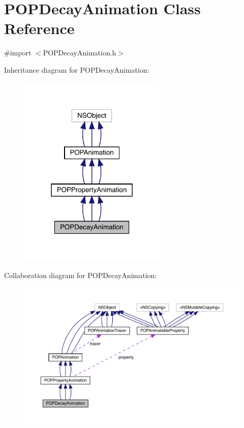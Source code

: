 \hypertarget{interface_p_o_p_decay_animation}{}\section{P\+O\+P\+Decay\+Animation Class Reference}
\label{interface_p_o_p_decay_animation}


{\ttfamily \#import $<$P\+O\+P\+Decay\+Animation.\+h$>$}



Inheritance diagram for P\+O\+P\+Decay\+Animation\+:\nopagebreak
\begin{figure}[H]
\begin{center}
\leavevmode
\includegraphics[width=199pt]{interface_p_o_p_decay_animation__inherit__graph}
\end{center}
\end{figure}


Collaboration diagram for P\+O\+P\+Decay\+Animation\+:\nopagebreak
\begin{figure}[H]
\begin{center}
\leavevmode
\includegraphics[width=350pt]{interface_p_o_p_decay_animation__coll__graph}
\end{center}
\end{figure}
